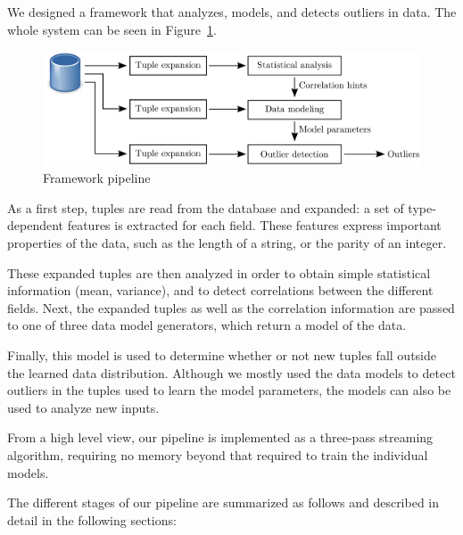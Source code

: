 We designed a framework that analyzes, models, and detects outliers in data.
The whole system can be seen in Figure~\ref{fig:pipeline}.

\begin{figure}
  \includegraphics[width=\textwidth]{../graphics/pipeline.pdf}
  \caption{Framework pipeline}
  \label{fig:pipeline}
\end{figure}

As a first step, tuples are read from the database and expanded: a set of type-dependent features is extracted for each field. These features express important properties of the data, such as the length of a string, or the parity of an integer.

These expanded tuples are then analyzed in order to obtain simple statistical information (mean, variance), and to detect correlations between the different fields. Next, the expanded tuples as well as the correlation information are passed to one of three data model generators, which return a model of the data.

Finally, this model is used to determine whether or not new tuples fall outside the learned data distribution. Although we mostly used the data models to detect outliers in the tuples used to learn the model parameters, the models can also be used to analyze new inputs.

From a high level view, our pipeline is implemented as a three-pass streaming algorithm, requiring no memory beyond that required to train the individual models.

The different stages of our pipeline are summarized as follows and described in detail in the following sections:

